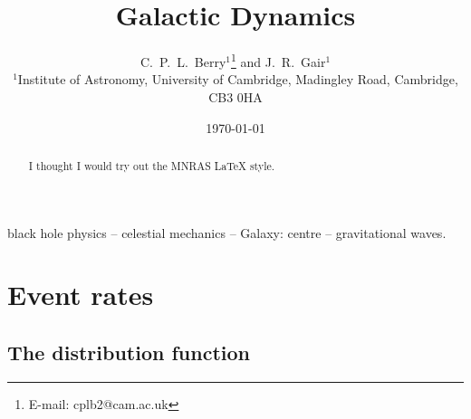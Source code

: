 \documentclass[useAMS,usedcolumn,usegraphicx,usenatbib]{mn2e}
\title[Galactic Dynamics]{Galactic Dynamics}
\author[C.\ P.\ L.\ Berry and J.\ R.\ Gair]{C.\ P.\ L.\ Berry$^{1}$\thanks{E-mail:
cplb2@cam.ac.uk}  and J.\ R.\ Gair$^{1}$\\
$^{1}$Institute of Astronomy, University of Cambridge, Madingley Road, Cambridge, CB3 0HA}
\begin{document}
\date{\today}

\pagerange{\pageref{firstpage}--\pageref{lastpage}} 

\maketitle

\label{firstpage}

\begin{abstract}
I thought I would try out the MNRAS \LaTeX{} style.
\end{abstract}

\begin{keywords}
black hole physics -- celestial mechanics --  Galaxy: centre -- gravitational waves.
\end{keywords}

\section{Event rates}

\subsection{The distribution function}
\end{document}
